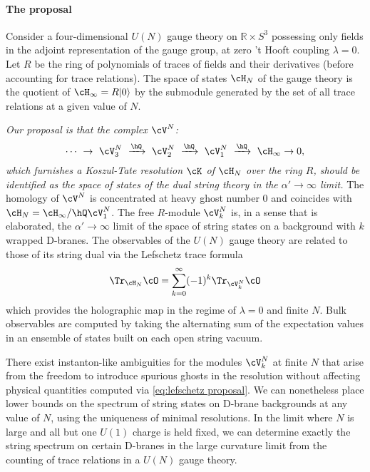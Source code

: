 \documentclass[a4paper,12pt]{article}
\begin{document}
\paragraph{The proposal}

Consider a four-dimensional $U(N)$ gauge theory on $\mathbb{R} \times S^3$ possessing only fields in the adjoint representation of the gauge group, at zero 't Hooft coupling $\lambda = 0$. Let $R$ be the ring of polynomials of traces of fields and their derivatives (before accounting for trace relations). The space of states $\cH_N$ of the gauge theory is the quotient of $\cH_\infty = R |0\rangle$ by the submodule generated by the set of all trace relations at a given value of $N$.

\textit{Our proposal is that the complex $\cV^N$:}
\begin{equation}
\cdots \ \rightarrow \ \cV_3^{N} \ \xrightarrow{\hQ} \ \cV_2^{N} \ \xrightarrow{\hQ} \ \cV_1^{N} \ \xrightarrow{\hQ} \ \cH_\infty \rightarrow 0,
\end{equation}
\textit{which furnishes a Koszul-Tate resolution $\cK$ of $\cH_N$ over the ring $R$, should be identified as the space of states of the dual string theory in the $\alpha' \to \infty$ limit.} The homology of $\cV^N$ is concentrated at heavy ghost number $0$ and coincides with $\cH_N = \cH_\infty / \hQ \cV_1^N$. The free $R$-module $\cV_k^N$ is, in a sense that is elaborated, the $\alpha' \to \infty$ limit of the space of string states on a background with $k$ wrapped D-branes. The observables of the $U(N)$ gauge theory are related to those of its string dual via the Lefschetz trace formula
\begin{equation} \label{eq:lefschetz proposal}
\Tr_{\cH_N} \cO = \sum_{k=0}^\infty (-1)^k \Tr_{\cV_k^N} \cO
\end{equation}
which provides the holographic map in the regime of $\lambda = 0$ and finite $N$. Bulk observables are computed by taking the alternating sum of the expectation values in an ensemble of states built on each open string vacuum.

There exist instanton-like ambiguities for the modules $\cV_k^N$ at finite $N$ that arise from the freedom to introduce spurious ghosts in the resolution without affecting physical quantities computed via \eqref{eq:lefschetz proposal}. We can nonetheless place lower bounds on the spectrum of string states on D-brane backgrounds at any value of $N$, using the uniqueness of minimal resolutions. In the limit where $N$ is large and all but one $U(1)$ charge is held fixed, we can determine exactly the string spectrum on certain D-branes in the large curvature limit from the counting of trace relations in a $U(N)$ gauge theory.
\end{document}
